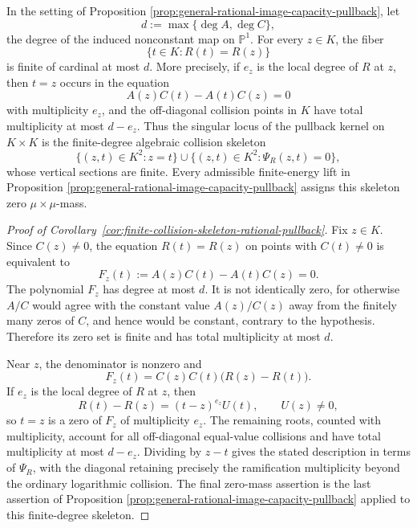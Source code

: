 \begin{corollary}\label{cor:finite-collision-skeleton-rational-pullback}
In the setting of Proposition \ref{prop:general-rational-image-capacity-pullback}, let
\[
d:=\max\{\deg A,\deg C\},
\]
the degree of the induced nonconstant map on \(\mathbb P^1\).  For every \(z\in K\), the fiber
\[
\{t\in K:R(t)=R(z)\}
\]
is finite of cardinal at most \(d\).  More precisely, if \(e_z\) is the local degree of \(R\) at \(z\), then \(t=z\) occurs in the equation
\[
A(z)C(t)-A(t)C(z)=0
\]
with multiplicity \(e_z\), and the off-diagonal collision points in \(K\) have total multiplicity at most \(d-e_z\).  Thus the singular locus of the pullback kernel on \(K\times K\) is the finite-degree algebraic collision skeleton
\[
\{(z,t)\in K^2:z=t\}\cup\{(z,t)\in K^2:\Psi_R(z,t)=0\},
\]
whose vertical sections are finite.  Every admissible finite-energy lift in Proposition \ref{prop:general-rational-image-capacity-pullback} assigns this skeleton zero \(\mu\times\mu\)-mass.
\end{corollary}

\begin{proof}[Proof of Corollary~\ref{cor:finite-collision-skeleton-rational-pullback}]
Fix \(z\in K\).  Since \(C(z)\ne0\), the equation \(R(t)=R(z)\) on points with \(C(t)\ne0\) is equivalent to
\[
F_z(t):=A(z)C(t)-A(t)C(z)=0.
\]
The polynomial \(F_z\) has degree at most \(d\).  It is not identically zero, for otherwise \(A/C\) would agree with the constant value \(A(z)/C(z)\) away from the finitely many zeros of \(C\), and hence would be constant, contrary to the hypothesis.  Therefore its zero set is finite and has total multiplicity at most \(d\).

Near \(z\), the denominator is nonzero and
\[
F_z(t)=C(z)C(t)\bigl(R(z)-R(t)\bigr).
\]
If \(e_z\) is the local degree of \(R\) at \(z\), then
\[
R(t)-R(z)=(t-z)^{e_z}U(t),\qquad U(z)\ne0,
\]
so \(t=z\) is a zero of \(F_z\) of multiplicity \(e_z\).  The remaining roots, counted with multiplicity, account for all off-diagonal equal-value collisions and have total multiplicity at most \(d-e_z\).  Dividing by \(z-t\) gives the stated description in terms of \(\Psi_R\), with the diagonal retaining precisely the ramification multiplicity beyond the ordinary logarithmic collision.  The final zero-mass assertion is the last assertion of Proposition \ref{prop:general-rational-image-capacity-pullback} applied to this finite-degree skeleton.
\end{proof}

